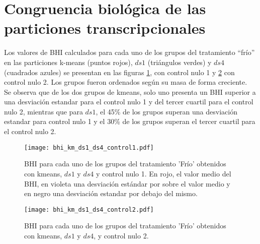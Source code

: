 \section{Congruencia biológica de las particiones transcripcionales}
Los valores de BHI calculados para cada uno de los grupos del tratamiento ``frío'' en las particiones k-means (puntos rojos), $ds1$ (triángulos verdes) y $ds4$ (cuadrados azules) se presentan en las figuras \ref{fig:bhi_km_ds1_ds4_control1}, con control nulo 1 y \ref{fig:bhi_km_ds1_ds4_control2} con control nulo 2. Los grupos fueron ordenados según su masa de forma creciente.\\
Se observa que de los dos grupos de kmeans, solo uno presenta un BHI superior a una desviación estandar para el control nulo 1 y del tercer cuartil para el control nulo 2, mientras que para $ds1$, el 45\% de los grupos superan una desviación estandar para control nulo 1 y el 30\% de los grupos superan el tercer cuartil para el control nulo 2.
\begin{figure*}[t!]
    \centering
    \begin{subfigure}[t]{0.8\textwidth}
    \centering
    \texttt{[image: bhi\_km\_ds1\_ds4\_control1.pdf]}
    \caption{BHI para cada uno de los grupos del tratamiento 'Frío' obtenidos con kmeans, $ds1$ y $ds4$ y control nulo 1. En rojo, el valor medio del BHI, en violeta una desviación estándar por sobre el valor medio y en negro una desviación estandar por debajo del mismo.}
    \label{fig:bhi_km_ds1_ds4_control1}
    \end{subfigure}
    \begin{subfigure}[t]{0.8\textwidth}
    \centering
    \texttt{[image: bhi\_km\_ds1\_ds4\_control2.pdf]}
    \caption{BHI para cada uno de los grupos del tratamiento 'Frío' obtenidos con kmeans, $ds1$ y $ds4$, y control nulo 2.}
    \label{fig:bhi_km_ds1_ds4_control2}
    \end{subfigure}
    \caption{Índice de Homogeneidad Biológica, BHI, para cada uno de los grupos del tratamiento 'Frío' obtenidos con kmeans, $ds1$ y $ds4$ y controles nulos.}
\end{figure*}

